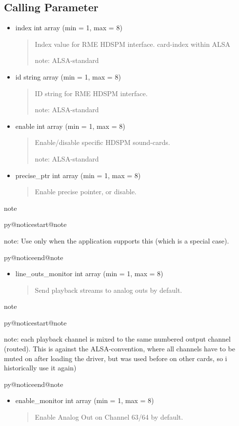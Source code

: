 \documentclass[a4paper,8pt,english]{sphinxmanual}
\makeatletter
\renewenvironment{notice}[2]{%
          \def\py@noticetype{#1}
          \begin{coloredbox}{#1}
          \bf\it
          \par\strong{#2}
          \csname py@noticestart@#1\endcsname
        }
	{
          \csname py@noticeend@\py@noticetype\endcsname
          \end{coloredbox}
        }
\makeatother
\begin{document}
\subsection{Calling Parameter}
\label{sound/cards/hdspm:calling-parameter}\begin{itemize}
\item {} 
index int array (min = 1, max = 8)
\begin{quote}

Index value for RME HDSPM interface. card-index within ALSA

note: ALSA-standard
\end{quote}

\item {} 
id string array (min = 1, max = 8)
\begin{quote}

ID string for RME HDSPM interface.

note: ALSA-standard
\end{quote}

\item {} 
enable int array (min = 1, max = 8)
\begin{quote}

Enable/disable specific HDSPM sound-cards.

note: ALSA-standard
\end{quote}

\item {} 
precise\_ptr int array (min = 1, max = 8)
\begin{quote}

Enable precise pointer, or disable.
\end{quote}

\end{itemize}

\begin{notice}{note}{Note:}
note: Use only when the application supports this (which is a special case).
\end{notice}
\begin{itemize}
\item {} 
line\_outs\_monitor int array (min = 1, max = 8)
\begin{quote}

Send playback streams to analog outs by default.
\end{quote}

\end{itemize}

\begin{notice}{note}{Note:}
note: each playback channel is mixed to the same numbered output
channel (routed). This is against the ALSA-convention, where all
channels have to be muted on after loading the driver, but was
used before on other cards, so i historically use it again)
\end{notice}
\begin{itemize}
\item {} 
enable\_monitor int array (min = 1, max = 8)
\begin{quote}

Enable Analog Out on Channel 63/64 by default.
\end{quote}

\end{itemize}
\end{document}
